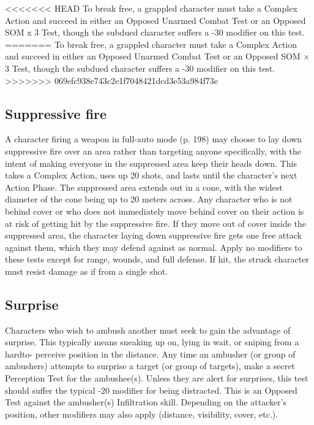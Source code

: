 <<<<<<< HEAD
To break free, a grappled character must take a Complex Action and succeed in either an Opposed Unarmed Combat Test or an Opposed SOM x 3 Test, though the subdued character suffers a -30 modifier on this test.
=======
To break free, a grappled character must take a Complex Action and succeed in either an Opposed Unarmed Combat Test or an Opposed SOM $\times$ 3 Test, though the subdued character suffers a -30 modifier on this test.
>>>>>>> 069efc938e743c2e1f7048421dcd3e53a984f73e


\subsection{Suppressive fire}
\label{sec:suppressive-fire}

A character firing a weapon in full-auto mode (p. 198) may choose to lay down suppressive fire over an area rather than targeting anyone specifically, with the intent of making everyone in the suppressed area keep their heads down. This takes a Complex Action, uses up 20 shots, and lasts until the character’s next Action Phase. The suppressed area extends out in a cone, with the widest diameter of the cone being up to 20 meters across. Any character who is not behind cover or who does not immediately move behind cover on their action is at risk of getting hit by the suppressive fire. If they move out of cover inside the suppressed area, the character laying down suppressive fire gets one free attack against them, which they may defend against as normal. Apply no modifiers to these tests except for range, wounds, and full defense. If hit, the struck character must resist damage as if from a single shot.


\subsection{Surprise}
\label{sec:surprise}

Characters who wish to ambush another must seek to gain the advantage of surprise. This typically means sneaking up on, lying in wait, or sniping from a hardto- perceive position in the distance. Any time an ambusher (or group of ambushers) attempts to surprise a target (or group of targets), make a secret Perception Test for the ambushee(s). Unless they are alert for surprises, this test should suffer the typical -20 modifier for being distracted. This is an Opposed Test against the ambusher(s) Infiltration skill. Depending on the attacker’s position, other modifiers may also apply (distance, visibility, cover, etc.).

